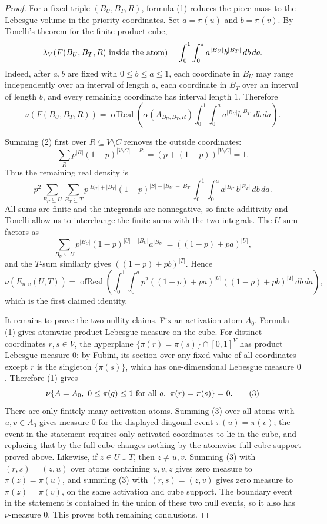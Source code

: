 \begin{proof}
For a fixed triple \((B_U,B_T,R)\), formula (1) reduces the piece mass to the
Lebesgue volume in the priority coordinates.  Set \(a=\pi(u)\) and
\(b=\pi(v)\).  By Tonelli's theorem for the finite product cube,
\[
\lambda_V(F(B_U,B_T,R)\hbox{ inside the atom})
=\int_0^1\int_0^a a^{|B_U|}b^{|B_T|}\,db\,da .
\]
Indeed, after \(a,b\) are fixed with \(0\le b\le a\le1\), each coordinate in
\(B_U\) may range independently over an interval of length \(a\), each
coordinate in \(B_T\) over an interval of length \(b\), and every remaining
coordinate has interval length \(1\).  Therefore
\[
\nu(F(B_U,B_T,R))
=\operatorname{ofReal}\!\left(
\alpha(A_{B_U,B_T,R})
\int_0^1\int_0^a a^{|B_U|}b^{|B_T|}\,db\,da\right).
\tag{2}
\]

Summing (2) first over \(R\subseteq V\setminus C\) removes the outside
coordinates:
\[
\sum_R p^{|R|}(1-p)^{|V\setminus C|-|R|}
=(p+(1-p))^{|V\setminus C|}=1 .
\]
Thus the remaining real density is
\[
p^2
\sum_{B_U\subseteq U}\sum_{B_T\subseteq T}
p^{|B_U|+|B_T|}(1-p)^{|S|-|B_U|-|B_T|}
\int_0^1\int_0^a a^{|B_U|}b^{|B_T|}\,db\,da .
\]
All sums are finite and the integrands are nonnegative, so finite additivity
and Tonelli allow us to interchange the finite sums with the two integrals.
The \(U\)-sum factors as
\[
\sum_{B_U\subseteq U}p^{|B_U|}(1-p)^{|U|-|B_U|}a^{|B_U|}
=((1-p)+pa)^{|U|},
\]
and the \(T\)-sum similarly gives \(((1-p)+pb)^{|T|}\).  Hence
\[
\nu(E_{u,v}(U,T))
=\operatorname{ofReal}\!\left(
\int_0^1\int_0^a
p^2((1-p)+pa)^{|U|}((1-p)+pb)^{|T|}\,db\,da\right),
\]
which is the first claimed identity.

It remains to prove the two nullity claims.  Fix an activation atom \(A_0\).
Formula (1) gives atomwise product Lebesgue measure on the cube.  For
distinct coordinates \(r,s\in V\), the hyperplane
\(\{\pi(r)=\pi(s)\}\cap[0,1]^V\) has product Lebesgue measure \(0\): by
Fubini, its section over any fixed value of all coordinates except \(r\) is
the singleton \(\{\pi(s)\}\), which has one-dimensional Lebesgue measure
\(0\).  Therefore (1) gives
\[
\nu\{A=A_0,\ 0\le\pi(q)\le1\hbox{ for all }q,\ \pi(r)=\pi(s)\}=0 .
\tag{3}
\]
There are only finitely many activation atoms.  Summing (3) over all atoms
with \(u,v\in A_0\) gives measure \(0\) for the displayed diagonal event
\(\pi(u)=\pi(v)\); the event in the statement requires only activated
coordinates to lie in the cube, and replacing that by the full cube changes
nothing by the atomwise full-cube support proved above.  Likewise, if
\(z\in U\cup T\), then \(z\ne u,v\).  Summing (3) with
\((r,s)=(z,u)\) over atoms containing \(u,v,z\) gives zero measure to
\(\pi(z)=\pi(u)\), and summing (3) with \((r,s)=(z,v)\) gives zero measure to
\(\pi(z)=\pi(v)\), on the same activation and cube support.  The boundary
event in the statement is contained in the union of these two null events, so
it also has \(\nu\)-measure \(0\).  This proves both remaining conclusions.
\end{proof}
